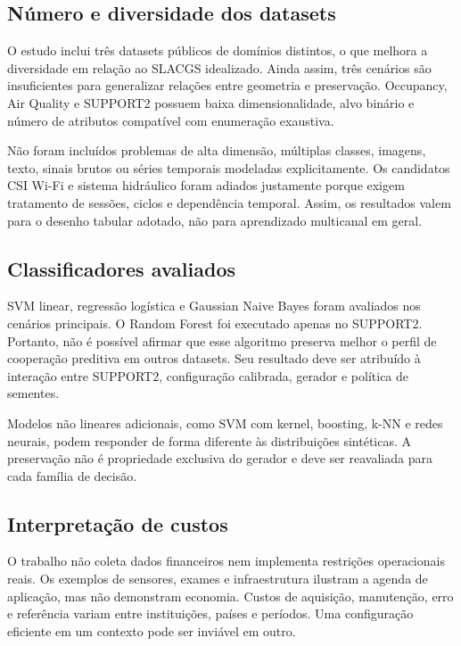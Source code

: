 \subsection{Número e diversidade dos datasets}

O estudo inclui três datasets públicos de domínios distintos, o que melhora a diversidade em relação ao SLACGS idealizado. Ainda assim, três cenários são insuficientes para generalizar relações entre geometria e preservação. Occupancy, Air Quality e SUPPORT2 possuem baixa dimensionalidade, alvo binário e número de atributos compatível com enumeração exaustiva.

Não foram incluídos problemas de alta dimensão, múltiplas classes, imagens, texto, sinais brutos ou séries temporais modeladas explicitamente. Os candidatos CSI Wi-Fi e sistema hidráulico foram adiados justamente porque exigem tratamento de sessões, ciclos e dependência temporal. Assim, os resultados valem para o desenho tabular adotado, não para aprendizado multicanal em geral.

\subsection{Classificadores avaliados}

SVM linear, regressão logística e Gaussian Naive Bayes foram avaliados nos cenários principais. O Random Forest foi executado apenas no SUPPORT2. Portanto, não é possível afirmar que esse algoritmo preserva melhor o perfil de cooperação preditiva em outros datasets. Seu resultado deve ser atribuído à interação entre SUPPORT2, configuração calibrada, gerador e política de sementes.

Modelos não lineares adicionais, como SVM com kernel, boosting, k-NN e redes neurais, podem responder de forma diferente às distribuições sintéticas. A preservação não é propriedade exclusiva do gerador e deve ser reavaliada para cada família de decisão.

\subsection{Interpretação de custos}

O trabalho não coleta dados financeiros nem implementa restrições operacionais reais. Os exemplos de sensores, exames e infraestrutura ilustram a agenda de aplicação, mas não demonstram economia. Custos de aquisição, manutenção, erro e referência variam entre instituições, países e períodos. Uma configuração eficiente em um contexto pode ser inviável em outro.

